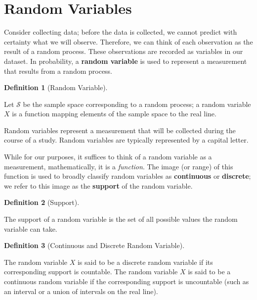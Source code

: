 \documentclass[
  letterpaper,
  DIV=11,
  numbers=noendperiod]{scrreprt}
\theoremstyle{definition}
\theoremstyle{definition}
\newtheorem{definition}{Definition}[chapter]
\theoremstyle{plain}
\theoremstyle{remark}
\begin{document}
\hypertarget{random-variables}{%
\section{Random Variables}\label{random-variables}}

Consider collecting data; before the data is collected, we cannot
predict with certainty what we will observe. Therefore, we can think of
each observation as the result of a random process. These observations
are recorded as variables in our dataset. In probability, a
\textbf{random variable} is used to represent a measurement that results
from a random process.

\begin{definition}[Random
Variable]\protect\hypertarget{def-random-variable}{}\label{def-random-variable}

Let \(\mathcal{S}\) be the sample space corresponding to a random
process; a random variable \(X\) is a function mapping elements of the
sample space to the real line.

Random variables represent a measurement that will be collected during
the course of a study. Random variables are typically represented by a
capital letter.

\end{definition}

While for our purposes, it suffices to think of a random variable as a
measurement, mathematically, it is a \emph{function}. The image (or
range) of this function is used to broadly classify random variables as
\textbf{continuous} or \textbf{discrete}; we refer to this image as the
\textbf{support} of the random variable.

\begin{definition}[Support]\protect\hypertarget{def-support}{}\label{def-support}

The support of a random variable is the set of all possible values the
random variable can take.

\end{definition}

\begin{definition}[Continuous and Discrete Random
Variable]\protect\hypertarget{def-rvtypes}{}\label{def-rvtypes}

The random variable \(X\) is said to be a discrete random variable if
its corresponding support is countable. The random variable \(X\) is
said to be a continuous random variable if the corresponding support is
uncountable (such as an interval or a union of intervals on the real
line).

\end{definition}
\end{document}

